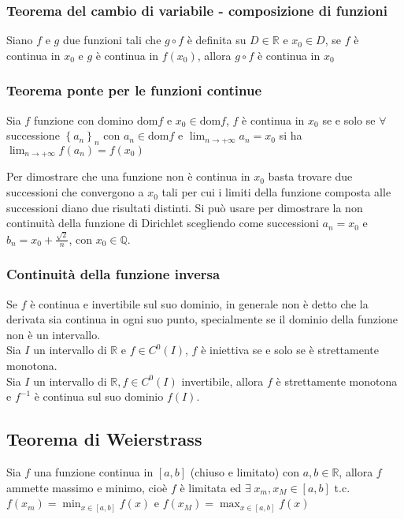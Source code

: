 \documentclass[a4paper]{article}
\newcommand\dom{\text{dom}}
\newcommand\cont[2]{C^{#1} \left({#2}\right)}
\begin{document}
\subsubsection*{Teorema del cambio di variabile - composizione di funzioni}
Siano \(f\) e \(g\) due funzioni tali che \(g \circ f\) è definita su \(D \in \mathbb{R}\) e \(x_0 \in D\),
se \(f\) è continua in \(x_0\) e \(g\) è continua in \(f(x_0)\), allora \(g \circ f\) è continua in \(x_0\)

\subsubsection*{Teorema ponte per le funzioni continue}
Sia \(f\) funzione con domino \(\dom f\) e \(x_0 \in \dom f\), \(f\) è continua in \(x_0\) se e solo se \(\forall\) successione \(\left\{a_n\right\}_n\)
con \(a_n \in \dom f\) e \(\displaystyle \lim_{n \to +\infty} a_n = x_0\) si ha \(\displaystyle \lim_{n \to +\infty} f(a_n) = f(x_0)\)

Per dimostrare che una funzione non è continua in \(x_0\) basta trovare due successioni che convergono a \(x_0\) tali per cui
i limiti della funzione composta alle successioni diano due risultati distinti. Si può usare per dimostrare la non continuità
della funzione di Dirichlet scegliendo come successioni \(a_n = x_0\) e \(b_n = x_0 + \frac{\sqrt{2}}{n}\), con \(x_0 \in \mathbb{Q}\).

\subsubsection*{Continuità della funzione inversa}
Se \(f\) è continua e invertibile sul suo dominio, in generale non è detto che la derivata sia continua in ogni suo punto,
specialmente se il dominio della funzione non è un intervallo. \\
Sia \(I\) un intervallo di \(\mathbb{R}\) e \(f \in \cont{0}{I}\), \(f\) è iniettiva se e solo se è strettamente monotona. \\
Sia \(I\) un intervallo di \(\mathbb{R}, f \in \cont{0}{I}\) invertibile, allora \(f\) è strettamente monotona e \(f^{-1}\)
è continua sul suo dominio \(f(I)\).

\subsection{Teorema di Weierstrass}
Sia \(f\) una funzione continua in \(\left[a, b\right]\) (chiuso e limitato) con \(a,b \in \mathbb{R}\), allora \(f\) ammette massimo e minimo,
cioè \(f\) è limitata ed \(\exists \; x_m, x_M \in \left[a, b\right]\) t.c. \(\displaystyle f(x_m) = \min_{x \in \left[a, b\right]} f(x)\)
e \(\displaystyle f(x_M) = \max_{x \in \left[a, b\right]} f(x)\)
\end{document}
